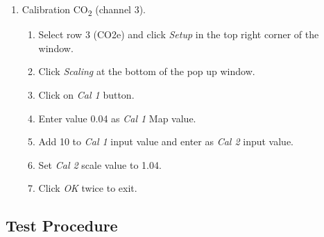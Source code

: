 \documentclass{article}
\begin{document}
\begin{enumerate}
	\item Calibration CO\textsubscript{2} (channel 3).
	\begin{enumerate}
		\item Select row 3 (CO2e) and click \textit{Setup} in the top right corner of the window.
	\item Click \textit{Scaling} at the bottom of the pop up window.
	\item Click on \textit{Cal 1} button.
		\item Enter value 0.04 as \textit{Cal 1} Map value.
		\item Add 10 to \textit{Cal 1} input value and enter as \textit{Cal 2} input value.
		\item Set \textit{Cal 2} scale value to 1.04.
	\item Click \textit{OK} twice to exit.
	\end{enumerate}
\end{enumerate}

\subsection*{Test Procedure}
\end{document}
